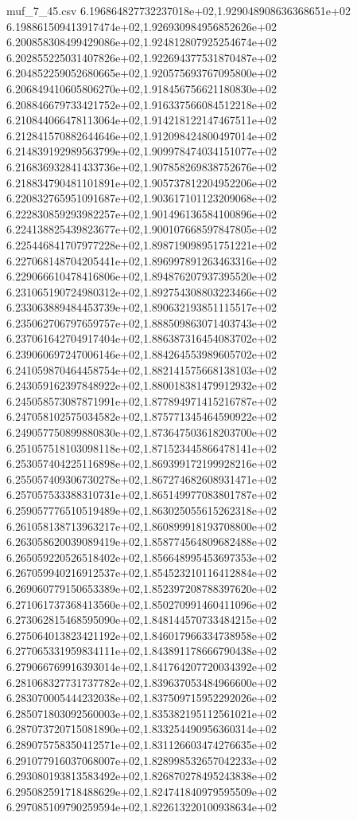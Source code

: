 \begin{filecontents*}{muf_7_45.csv}
6.196864827732237018e+02,1.929048908636368651e+02
6.198861509413917474e+02,1.926930984956852626e+02
6.200858308499429086e+02,1.924812807925254674e+02
6.202855225031407826e+02,1.922694377531870487e+02
6.204852259052680665e+02,1.920575693767095800e+02
6.206849410605806270e+02,1.918456756621180830e+02
6.208846679733421752e+02,1.916337566084512218e+02
6.210844066478113064e+02,1.914218122147467511e+02
6.212841570882644646e+02,1.912098424800497014e+02
6.214839192989563799e+02,1.909978474034151077e+02
6.216836932841433736e+02,1.907858269838752676e+02
6.218834790481101891e+02,1.905737812204952206e+02
6.220832765951091687e+02,1.903617101123209068e+02
6.222830859293982257e+02,1.901496136584100896e+02
6.224138825439823677e+02,1.900107668597847805e+02
6.225446841707977228e+02,1.898719098951751221e+02
6.227068148704205441e+02,1.896997891263463316e+02
6.229066610478416806e+02,1.894876207937395520e+02
6.231065190724980312e+02,1.892754308803223466e+02
6.233063889484453739e+02,1.890632193851115517e+02
6.235062706797659757e+02,1.888509863071403743e+02
6.237061642704917404e+02,1.886387316454083702e+02
6.239060697247006146e+02,1.884264553989605702e+02
6.241059870464458754e+02,1.882141575668138103e+02
6.243059162397848922e+02,1.880018381479912932e+02
6.245058573087871991e+02,1.877894971415216787e+02
6.247058102575034582e+02,1.875771345464590922e+02
6.249057750899880830e+02,1.873647503618203700e+02
6.251057518103098118e+02,1.871523445866478141e+02
6.253057404225116898e+02,1.869399172199928216e+02
6.255057409306730278e+02,1.867274682608931471e+02
6.257057533388310731e+02,1.865149977083801787e+02
6.259057776510519489e+02,1.863025055615262318e+02
6.261058138713963217e+02,1.860899918193708800e+02
6.263058620039089419e+02,1.858774564809682488e+02
6.265059220526518402e+02,1.856648995453697353e+02
6.267059940216912537e+02,1.854523210116412884e+02
6.269060779150653389e+02,1.852397208788397620e+02
6.271061737368413560e+02,1.850270991460411096e+02
6.273062815468595090e+02,1.848144570733484215e+02
6.275064013823421192e+02,1.846017966334738958e+02
6.277065331959834111e+02,1.843891178666790438e+02
6.279066769916393014e+02,1.841764207720034392e+02
6.281068327731737782e+02,1.839637053484966600e+02
6.283070005444232038e+02,1.837509715952292026e+02
6.285071803092560003e+02,1.835382195112561021e+02
6.287073720715081890e+02,1.833254490956360314e+02
6.289075758350412571e+02,1.831126603474276635e+02
6.291077916037068007e+02,1.828998532657042233e+02
6.293080193813583492e+02,1.826870278495243838e+02
6.295082591718488629e+02,1.824741840979595509e+02
6.297085109790259594e+02,1.822613220100938634e+02

\end{filecontents*}
